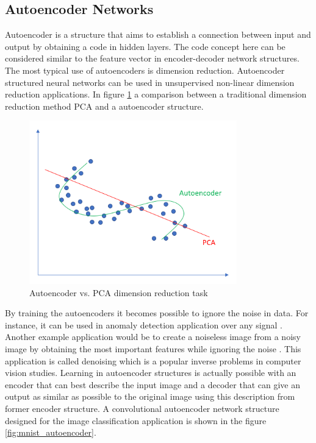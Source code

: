 \subsection{Autoencoder Networks}

Autoencoder is a structure that aims to establish a connection between input and output by obtaining a code in hidden layers. The code concept here can be considered similar to the feature vector in encoder-decoder network structures. The most typical use of autoencoders is dimension reduction. Autoencoder structured neural networks can be used in unsupervised non-linear dimension reduction applications. In figure \ref{fig:autoencoder_vs_pca} a comparison between a traditional dimension reduction method PCA \cite{pca} and a autoencoder structure.

\begin{figure}[h!]
    \centering
    \includegraphics[width=9cm]{figures/chapter3/autoencoder_vs_pca.png}
    \caption{Autoencoder vs. PCA dimension reduction task \cite{autoencoder_vs_pca}}
    \label{fig:autoencoder_vs_pca}
\end{figure}

By training the autoencoders it becomes possible to ignore the noise in data. For instance, it can be used in anomaly detection application over any signal \cite{anomaly_detection1} \cite{anomaly_detection2}. Another example application would be to create a noiseless image from a noisy image by obtaining the most important features while ignoring the noise \cite{denoising}. This application is called denoising which is a popular inverse problems in computer vision studies. Learning in autoencoder structures is actually possible with an encoder that can best describe the input image and a decoder that can give an output as similar as possible to the original image using this description from former encoder structure. A convolutional autoencoder network structure designed for the image classification application is shown in the figure \ref{fig:mnist_autoencoder}.

